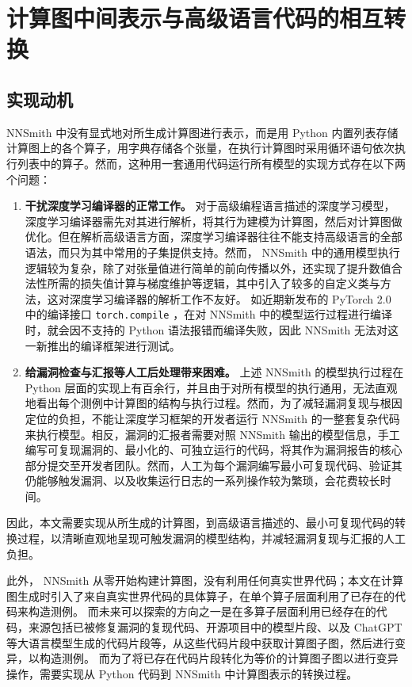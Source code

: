 
\chapter{计算图中间表示与高级语言代码的相互转换}
\label{chp:eng}

\section{实现动机}

NNSmith 中没有显式地对所生成计算图进行表示，而是用 Python 内置列表存储计算图上的各个算子，用字典存储各个张量，在执行计算图时采用循环语句依次执行列表中的算子。\cite{nnsmith_old}然而，这种用一套通用代码运行所有模型的实现方式存在以下两个问题：
\begin{enumerate}
    \item \textbf{干扰深度学习编译器的正常工作。} 对于高级编程语言描述的深度学习模型，深度学习编译器需先对其进行解析，将其行为建模为计算图，然后对计算图做优化。但在解析高级语言方面，深度学习编译器往往不能支持高级语言的全部语法，而只为其中常用的子集提供支持。然而， NNSmith 中的通用模型执行逻辑较为复杂，除了对张量值进行简单的前向传播以外，还实现了提升数值合法性所需的损失值计算与梯度维护等逻辑，其中引入了较多的自定义类与方法，这对深度学习编译器的解析工作不友好。
    如近期新发布的 PyTorch 2.0 \cite{pt2_release} 中的编译接口 \texttt{torch.compile} ，在对 NNSmith 中的模型运行过程进行编译时，就会因不支持的 Python 语法报错而编译失败，因此 NNSmith 无法对这一新推出的编译框架进行测试。
    \item \textbf{给漏洞检查与汇报等人工后处理带来困难。} 上述 NNSmith 的模型执行过程在 Python 层面的实现上有百余行，并且由于对所有模型的执行通用，无法直观地看出每个测例中计算图的结构与执行过程。然而，为了减轻漏洞复现与根因定位的负担，不能让深度学习框架的开发者运行 NNSmith 的一整套复杂代码来执行模型。相反，漏洞的汇报者需要对照 NNSmith 输出的模型信息，手工编写可复现漏洞的、最小化的、可独立运行的代码，将其作为漏洞报告的核心部分提交至开发者团队。然而，人工为每个漏洞编写最小可复现代码、验证其仍能够触发漏洞、以及收集运行日志的一系列操作较为繁琐，会花费较长时间。
\end{enumerate}
因此，本文需要实现从所生成的计算图，到高级语言描述的、最小可复现代码的转换过程，以清晰直观地呈现可触发漏洞的模型结构，并减轻漏洞复现与汇报的人工负担。

此外， NNSmith 从零开始构建计算图，没有利用任何真实世界代码；本文在计算图生成时引入了来自真实世界代码的具体算子，在单个算子层面利用了已存在的代码来构造测例。
而未来可以探索的方向之一是在多算子层面利用已经存在的代码，来源包括已被修复漏洞的复现代码、开源项目中的模型片段、以及 ChatGPT\cite{chatgpt}等大语言模型生成的代码片段等，从这些代码片段中获取计算图子图，然后进行变异，以构造测例。
而为了将已存在代码片段转化为等价的计算图子图以进行变异操作，需要实现从 Python 代码到 NNSmith 中计算图表示的转换过程。

